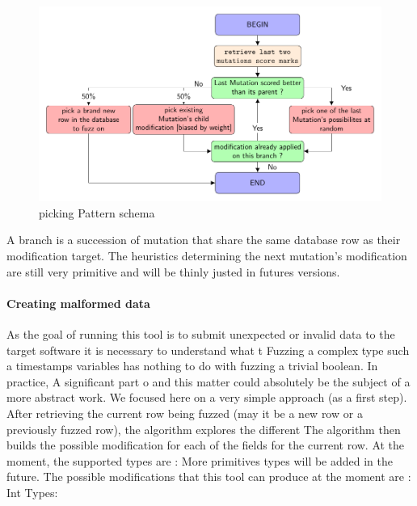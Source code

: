 \documentclass{article}
\begin{document}
\begin{empfile}
\begin{itemize}
\begin{figure}[h!]
\centering
\includegraphics[width=\textwidth]{pickingPaternDiagram.pdf}
\caption{picking Pattern schema}
\end{figure}				
				
				\end{itemize}
A branch is a succession of mutation that share the same database row as their modification target.
The heuristics determining the next mutation's modification are still very primitive and will be thinly justed in futures versions.								 
				\paragraph{Creating malformed data} 
As the goal of running this tool is to submit unexpected or invalid data to the target software it is necessary to understand what t
Fuzzing a complex type such a timestamps variables has nothing to do with fuzzing a trivial boolean. In practice, A significant part o
and this matter could absolutely be the subject of a more abstract work. We focused here on a very simple approach (as a first step).
After retrieving the current row being fuzzed (may it be a new row or a previously fuzzed row), the algorithm explores the different
The algorithm then builds the possible modification for each of the fields for the current row.
At the moment, the supported types are : %
More primitives types will be added in the future.
The possible modifications that this tool can produce at the moment are : \\ %
				Int Types:
				\begin{itemize}
		

\end{itemize}
\end{empfile}
\end{document}
